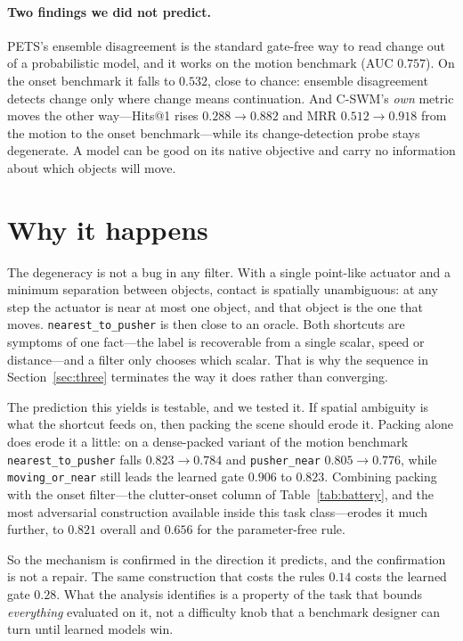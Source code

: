 \documentclass{article}
\begin{document}
\paragraph{Two findings we did not predict.} PETS's ensemble disagreement is the standard
gate-free way to read change out of a probabilistic model, and it works on the motion benchmark
(AUC $0.757$). On the onset benchmark it falls to $0.532$, close to chance: ensemble
disagreement detects change only where change means continuation. And C-SWM's \emph{own}
metric moves the other way---Hits@1 rises $0.288 \rightarrow 0.882$ and MRR
$0.512 \rightarrow 0.918$ from the motion to the onset benchmark---while its change-detection
probe stays degenerate. A model can be good on its native objective and carry no information
about which objects will move.

\section{Why it happens}
\label{sec:mechanism}

The degeneracy is not a bug in any filter. With a single point-like actuator and a minimum
separation between objects, contact is spatially unambiguous: at any step the actuator is near
at most one object, and that object is the one that moves. \texttt{nearest\_to\_pusher} is then
close to an oracle. Both shortcuts are symptoms of one fact---the label is recoverable from a
single scalar, speed or distance---and a filter only chooses which scalar. That is why the
sequence in Section~\ref{sec:three} terminates the way it does rather than converging.

The prediction this yields is testable, and we tested it. If spatial ambiguity is what the
shortcut feeds on, then packing the scene should erode it. Packing alone does erode it a
little: on a dense-packed variant of the motion benchmark \texttt{nearest\_to\_pusher} falls
$0.823 \rightarrow 0.784$ and \texttt{pusher\_near} $0.805 \rightarrow 0.776$, while
\texttt{moving\_or\_near} still leads the learned gate $0.906$ to $0.823$. Combining packing
with the onset filter---the clutter-onset column of Table~\ref{tab:battery}, and the most
adversarial construction available inside this task class---erodes it much further, to $0.821$
overall and $0.656$ for the parameter-free rule.

So the mechanism is confirmed in the direction it predicts, and the confirmation is not a
repair. The same construction that costs the rules $0.14$ costs the learned gate $0.28$. What
the analysis identifies is a property of the task that bounds \emph{everything} evaluated on
it, not a difficulty knob that a benchmark designer can turn until learned models win.
\end{document}
